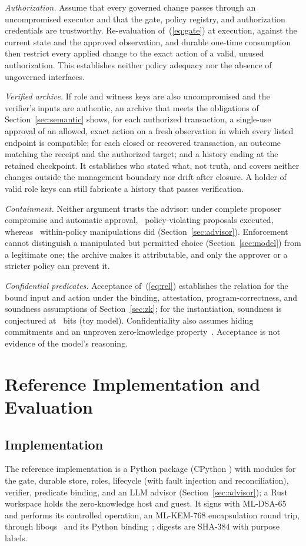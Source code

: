 \documentclass[journal]{IEEEtran}
\begin{document}
\emph{Authorization.} Assume that every governed change passes through an uncompromised executor and that the gate, policy registry, and authorization credentials are trustworthy. Re-evaluation of~(\ref{eq:gate}) at execution, against the current state and the approved observation, and durable one-time consumption then restrict every applied change to the exact action of a valid, unused authorization. This establishes neither policy adequacy nor the absence of ungoverned interfaces.

\emph{Verified archive.} If role and witness keys are also uncompromised and the verifier's inputs are authentic, an archive that meets the obligations of Section~\ref{sec:semantic} shows, for each authorized transaction, a single-use approval of an allowed, exact action on a fresh observation in which every listed endpoint is compatible; for each closed or recovered transaction, an outcome matching the receipt and the authorized target; and a history ending at the retained checkpoint. It establishes who stated what, not truth, and covers neither changes outside the management boundary nor drift after closure. A holder of valid role keys can still fabricate a history that passes verification.

\emph{Containment.} Neither argument trusts the advisor: under complete proposer compromise and automatic approval, \AdvCompViolExecuted\ policy-violating proposals executed, whereas \AdvCompInPolicyExecuted\ within-policy manipulations did (Section~\ref{sec:advisor}). Enforcement cannot distinguish a manipulated but permitted choice (Section~\ref{sec:model}) from a legitimate one; the archive makes it attributable, and only the approver or a stricter policy can prevent it.

\emph{Confidential predicates.} Acceptance of~(\ref{eq:rel}) establishes the relation for the bound input and action under the binding, attestation, program-correctness, and soundness assumptions of Section~\ref{sec:zk}; for the instantiation, soundness is conjectured at \ZkEndBits~bits (toy model). Confidentiality also assumes hiding commitments and an unproven zero-knowledge property~\cite{risc0sec}. Acceptance is not evidence of the model's reasoning.

\section{Reference Implementation and Evaluation}
\label{sec:proto}

\subsection{Implementation}
The reference implementation is a Python package (CPython \EnvPython) with modules for the gate, durable store, roles, lifecycle (with fault injection and reconciliation), verifier, predicate binding, and an LLM advisor (Section~\ref{sec:advisor}); a Rust workspace holds the zero-knowledge host and guest. It signs with ML-DSA-65 and performs its controlled operation, an ML-KEM-768 encapsulation round trip, through liboqs \EnvLiboqs\ and its Python binding~\cite{liboqs}; digests are SHA-384 with purpose labels.
\end{document}

